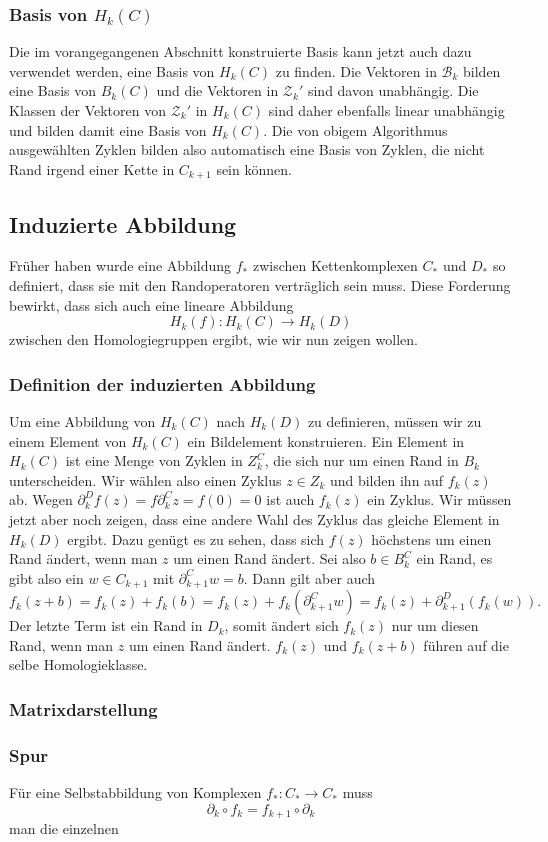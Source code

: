 \subsubsection{Basis von $H_k(C)$}
Die im vorangegangenen Abschnitt konstruierte Basis kann jetzt auch
dazu verwendet werden, eine Basis von $H_k(C)$ zu finden.
Die Vektoren in $\mathcal{B}_k$ bilden eine Basis von $B_k(C)$
und die Vektoren in $\mathcal{Z}_k'$ sind davon unabhängig.
Die Klassen der Vektoren von $\mathcal{Z}_k'$ in $H_k(C)$ sind
daher ebenfalls linear unabhängig und bilden damit eine Basis
von $H_k(C)$.
Die von obigem Algorithmus ausgewählten Zyklen bilden also automatisch
eine Basis von Zyklen, die nicht Rand irgend einer Kette in $C_{k+1}$
sein können.

\subsection{Induzierte Abbildung
\label{buch:subsection:induzierte-abbildung}}
Früher haben wurde eine Abbildung $f_*$ zwischen Kettenkomplexen $C_*$ und
$D_*$ so definiert,
dass sie mit den Randoperatoren verträglich sein muss.
Diese Forderung bewirkt, dass sich auch eine lineare Abbildung
\[
H_k(f) \colon H_k(C) \to H_k(D)
\]
zwischen den Homologiegruppen ergibt, wie wir nun zeigen wollen.

\subsubsection{Definition der induzierten Abbildung}
Um eine Abbildung von $H_k(C)$ nach $H_k(D)$ zu definieren, müssen wir
zu einem Element von $H_k(C)$ ein Bildelement konstruieren.
Ein Element in $H_k(C)$ ist eine Menge von Zyklen in $Z^C_k$, die sich
nur um einen Rand in $B_k$ unterscheiden.
Wir wählen also einen Zyklus $z\in Z_k$ und bilden ihn auf $f_k(z)$ ab.
Wegen $\partial^D_kf(z)=f\partial^C_kz = f(0) =0 $ ist auch $f_k(z)$
ein Zyklus.
Wir müssen jetzt aber noch zeigen, dass eine andere Wahl des Zyklus
das gleiche Element in $H_k(D)$ ergibt.
Dazu genügt es zu sehen, dass sich $f(z)$ höchstens um einen Rand
ändert, wenn man $z$ um einen Rand ändert.
Sei also $b\in B^C_k$ ein Rand, es gibt also ein $w\in C_{k+1}$ mit
$\partial^C_{k+1}w=b$.
Dann gilt aber auch
\[
f_k(z+b)
=
f_k(z) + f_k(b)
=
f_k(z) + f_k(\partial^C_{k+1}w)
=
f_k(z) + \partial^D_{k+1}(f_k(w)).
\]
Der letzte Term ist ein Rand in $D_k$, somit ändert sich $f_k(z)$ nur
um diesen Rand, wenn man $z$ um einen Rand ändert.
$f_k(z)$ und $f_k(z+b)$ führen auf die selbe Homologieklasse.

\subsubsection{Matrixdarstellung}

\subsubsection{Spur}
Für eine Selbstabbildung von Komplexen $f_*\colon C_*\to C_*$ muss
\[
\partial_{k}\circ f_{k}
=
f_{k+1}\circ \partial_{k}
\]
man die einzelnen




